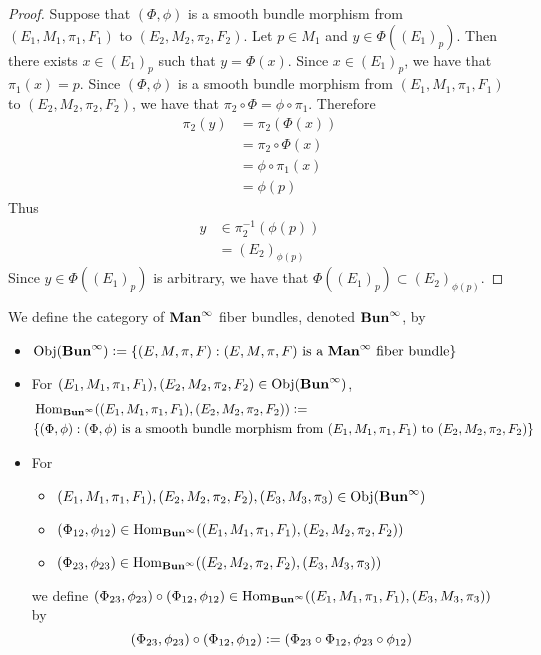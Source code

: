 \documentclass{book}
\begin{document}
	\begin{proof}
		Suppose that $(\Phi, \phi)$ is a smooth bundle morphism from $(E_1, M_1, \pi_1, F_1)$ to $(E_2, M_2, \pi_2, F_2)$. Let $p \in M_1$ and $y \in \Phi((E_1)_p)$. Then there exists $x \in (E_1)_p$ such that $y = \Phi(x)$. Since $x \in (E_1)_p$, we have that $\pi_1(x) = p$. Since  $(\Phi, \phi)$ is a smooth bundle morphism from $(E_1, M_1, \pi_1, F_1)$ to $(E_2, M_2, \pi_2, F_2)$, we have that $\pi_2 \circ \Phi = \phi \circ \pi_1$. Therefore 
		\begin{align*}
			\pi_2(y)
			& = \pi_2 (\Phi(x)) \\
			& = \pi_2 \circ \Phi (x) \\
			& = \phi \circ \pi_1 (x) \\
			& = \phi(p) 
		\end{align*}
		Thus 
		\begin{align*}
			y
			& \in \pi_2^{-1}(\phi(p)) \\
			& = (E_2)_{\phi(p)}
		\end{align*}
		Since $y \in \Phi((E_1)_p)$ is arbitrary, we have that $\Phi((E_1)_p) \subset (E_2)_{\phi(p)}$.
	\end{proof}
	
	\begin{defn} 
		We define the category of $\operatorname*{\text{\textbf{Man}}^{\infty}}$ fiber bundles, denoted $\operatorname*{\text{\textbf{Bun}}^{\infty}}$, by 
		\begin{itemize}
			\item $\operatorname{Obj}(\operatorname*{\text{\textbf{Bun}}^{\infty}}) \vcentcolon= \{(E, M, \pi, F): (E, M, \pi, F) \text{ is a $\operatorname*{\text{\textbf{Man}}^{\infty}}$ fiber bundle}\}$ 
			\item For $(E_1, M_1, \pi_1, F_1), (E_2, M_2, \pi_2, F_2) \in \operatorname{Obj}(\operatorname*{\text{\textbf{Bun}}^{\infty}})$, 
			\begin{align*}
				& \operatorname{Hom}_{\operatorname*{\text{\textbf{Bun}}^{\infty}}}((E_1, M_1, \pi_1, F_1), (E_2, M_2, \pi_2, F_2)) \vcentcolon= \\
				& \{(\Phi, \phi): (\Phi, \phi) \text{ is a smooth bundle morphism from $(E_1, M_1, \pi_1, F_1)$ to $(E_2, M_2, \pi_2, F_2)$} \}
			\end{align*}
			\item For 
			\begin{itemize}
				\item $(E_1, M_1, \pi_1, F_1), (E_2, M_2, \pi_2, F_2), (E_3, M_3, \pi_3) \in \operatorname{Obj}(\operatorname*{\text{\textbf{Bun}}^{\infty}})$ 
				\item $(\Phi_{12}, \phi_{12}) \in \operatorname{Hom}_{\operatorname*{\text{\textbf{Bun}}^{\infty}}}((E_1, M_1, \pi_1, F_1), (E_2, M_2, \pi_2, F_2))$
				\item $(\Phi_{23}, \phi_{23}) \in \operatorname{Hom}_{\operatorname*{\text{\textbf{Bun}}^{\infty}}}((E_2, M_2, \pi_2, F_2), (E_3, M_3, \pi_3))$ 
			\end{itemize}
			we define $(\Phi_{23}, \phi_{23}) \circ (\Phi_{12}, \phi_{12}) \in \operatorname{Hom}_{\operatorname*{\text{\textbf{Bun}}^{\infty}}}((E_1, M_1, \pi_1, F_1), (E_3, M_3, \pi_3))$ by 
			$$(\Phi_{23}, \phi_{23}) \circ (\Phi_{12}, \phi_{12}) \vcentcolon= (\Phi_{23} \circ \Phi_{12}, \phi_{23} \circ \phi_{12})$$
		\end{itemize}
	\end{defn}
\end{document}
